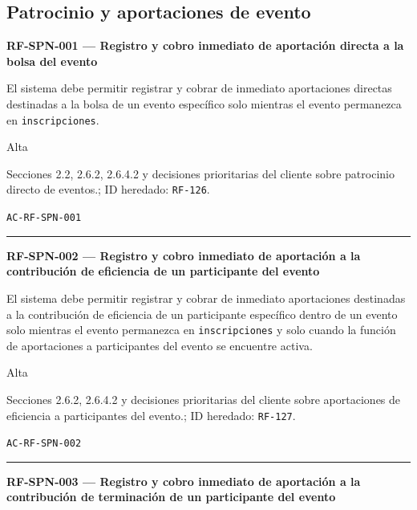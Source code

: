 \documentclass[10pt,letterpaper]{article}
\begin{document}
\subsection{Patrocinio y aportaciones de evento}
\noindent\textbf{RF-SPN-001 --- Registro y cobro inmediato de aportación directa a la bolsa del evento}\par
\begin{description}[style=nextline,leftmargin=3.15cm,labelwidth=2.8cm,font=\normalfont\bfseries]
\item[Obligación] El sistema debe permitir registrar y cobrar de inmediato aportaciones directas destinadas a la bolsa de un evento específico solo mientras el evento permanezca en \texttt{inscripciones}.
\item[Prioridad] Alta
\item[Procedencia] Secciones 2.2, 2.6.2, 2.6.4.2 y decisiones prioritarias del cliente sobre patrocinio directo de eventos.; ID heredado: \texttt{RF-126}.
\item[Verificación] \texttt{AC-RF-SPN-001}
\end{description}
\vspace{0.25em}\hrule\vspace{0.65em}
\noindent\textbf{RF-SPN-002 --- Registro y cobro inmediato de aportación a la contribución de eficiencia de un participante del evento}\par
\begin{description}[style=nextline,leftmargin=3.15cm,labelwidth=2.8cm,font=\normalfont\bfseries]
\item[Obligación] El sistema debe permitir registrar y cobrar de inmediato aportaciones destinadas a la contribución de eficiencia de un participante específico dentro de un evento solo mientras el evento permanezca en \texttt{inscripciones} y solo cuando la función de aportaciones a participantes del evento se encuentre activa.
\item[Prioridad] Alta
\item[Procedencia] Secciones 2.6.2, 2.6.4.2 y decisiones prioritarias del cliente sobre aportaciones de eficiencia a participantes del evento.; ID heredado: \texttt{RF-127}.
\item[Verificación] \texttt{AC-RF-SPN-002}
\end{description}
\vspace{0.25em}\hrule\vspace{0.65em}
\noindent\textbf{RF-SPN-003 --- Registro y cobro inmediato de aportación a la contribución de terminación de un participante del evento}\par
\end{document}
